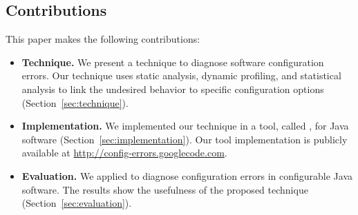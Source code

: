 





\subsection{Contributions}
This paper makes the following contributions:

\begin{itemize}

\item \textbf{Technique.} We present a technique to diagnose
software configuration errors. Our technique uses static analysis,
dynamic profiling, and statistical analysis to link the
undesired behavior to specific configuration options (Section~\ref{sec:technique}).


\item \textbf{Implementation.} We implemented our technique 
in a tool, called \ourtool, for Java software (Section~\ref{sec:implementation}). Our tool implementation is publicly available at
\url{http://config-errors.googlecode.com}. 


\item \textbf{Evaluation.} We applied \ourtool to diagnose
\errors configuration errors in \subjectnum
configurable Java software. The results
show the usefulness of the proposed technique (Section~\ref{sec:evaluation}).

\end{itemize}



